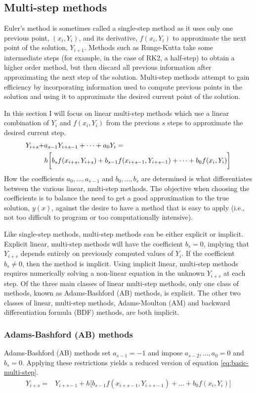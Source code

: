 \documentclass[11pt]{article}
\begin{document}
\subsection{Multi-step methods}
Euler's method is sometimes called a single-step method as it uses only one previous point, $(x_i, Y_i)$, and its derivative, $f(x_i, Y_i)$ to approximate the next point of the solution, $Y_{i+1}$.  Methods such as Runge-Kutta take some intermediate steps (for example, in the case of RK2, a half-step) to obtain a higher order method, but then discard all previous information after approximating the next step of the solution. Multi-step methods attempt to gain efficiency by incorporating information used to compute previous points in the solution and using it to approximate the desired current point of the solution. 

In this section I will focus on linear multi-step methods which use a linear combination of $Y_i$ and $f(x_i, Y_i)$ from the previous $s$ steps to approximate the desired current step.
\begin{align}\label{eq:basic-multi-step}
	Y_{i+s} +& a_{s-1}Y_{i+s-1} + \dots + a_0Y_{i} = \notag \\
	&h\bigg[b_sf(x_{i+s},Y_{i+s}) + b_{s-1}f(x_{i+s-1},Y_{i+s-1}) + \dots + b_0f(x_i, Y_{i}) \bigg]
\end{align}
How the coefficients $a_0, \dots, a_{s-1}$ and $b_0,\dots,b_s$ are determined is what differentiates between the various linear, multi-step methods. The objective when choosing the coefficients is to balance the need to get a good approximation to the true solution, $y(x)$, against the desire to have a method that is easy to apply (i.e., not too difficult to program or too computationally intensive).  

Like single-step methods, multi-step methods can be either explicit or implicit.  Explicit linear, multi-step methods will have the coefficient $b_s=0$, implying that $Y_{i+s}$ depends entirely on previously computed values of $Y_i$. If the coefficient $b_s\neq0$, then the method is implicit.  Using implicit linear, multi-step methods requires numerically solving a non-linear equation in the unknown $Y_{i+s}$ at each step. Of the three main classes of linear multi-step methods, only one class of methods, known as Adams-Bashford (AB) methods, is explicit. The other two classes of linear, multi-step methods, Adams-Moulton (AM) and backward differentiation formula (BDF) methods, are both implicit.

\subsubsection{Adams-Bashford (AB) methods}
Adams-Bashford (AB) methods set $a_{s-1}=-1$ and impose $a_{s-2},\dots,a_{0}=0$ and $b_s=0$. Applying these restrictions yields a reduced version of equation \ref{eq:basic-multi-step}.
\begin{align}
	Y_{i+s} =& Y_{i+s-1} +h\bigg[b_{s-1}f(x_{i+s-1},Y_{i+s-1}) + \dots + b_0f(x_i, Y_{i}) \bigg]
\end{align}
\end{document}
